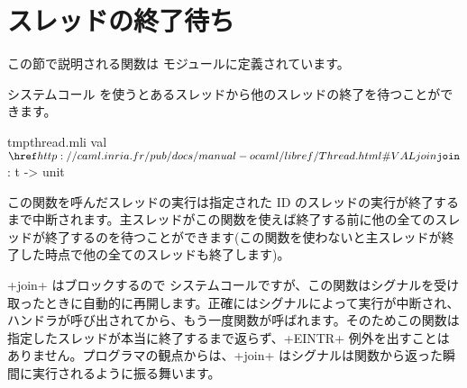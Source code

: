 \section{スレッドの終了待ち}

この節で説明される関数は  モジュールに定義されています。

システムコール  を使うとあるスレッドから他のスレッドの終了を待つことができます。
%
\begin{listingcodefile}{tmpthread.mli}
val $\libvalue{Thread}{join}$ : t -> unit
\end{listingcodefile}
%
この関数を呼んだスレッドの実行は指定された ID のスレッドの実行が終了するまで中断されます。主スレッドがこの関数を使えば終了する前に他の全てのスレッドが終了するのを待つことができます(この関数を使わないと主スレッドが終了した時点で他の全てのスレッドも終了します)。

\ml+join+ はブロックするので  システムコールですが、この関数はシグナルを受け取ったときに自動的に再開します。正確にはシグナルによって実行が中断され、ハンドラが呼び出されてから、もう一度関数が呼ばれます。そのためこの関数は指定したスレッドが本当に終了するまで返らず、\ml+EINTR+ 例外を出すことはありません。\ocaml プログラマの観点からは、\ml+join+ はシグナルは関数から返った瞬間に実行されるように振る舞います。


